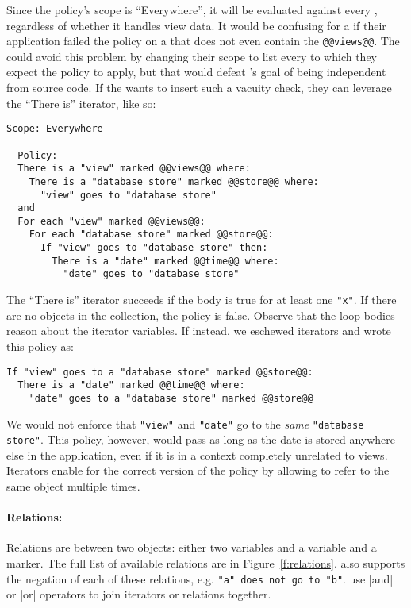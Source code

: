Since the policy's scope is ``Everywhere'', it will be evaluated against every \controller{},
regardless of whether it handles view data.
%
It would be confusing for a \dev{} if their application failed the policy on a \controller{} 
that does not even contain the \lstinline[language=CNL]|@@views@@|.
%
The \ce{} could avoid this problem by changing their scope to list every \controller{} to which they expect the policy to apply,
but that would defeat \syslang's goal of being independent from source code.
%
If the \ce{} wants to insert such a vacuity check, they can leverage the ``There is'' iterator, like so:
\begin{lstlisting}[language=CNL]
  Scope: Everywhere
  
  Policy:
  There is a "view" marked @@views@@ where:
    There is a "database store" marked @@store@@ where:
      "view" goes to "database store"
  and
  For each "view" marked @@views@@:
    For each "database store" marked @@store@@:
      If "view" goes to "database store" then:
        There is a "date" marked @@time@@ where:
          "date" goes to "database store"
\end{lstlisting}
%
The ``There is'' iterator succeeds if the body is true for at least one \lstinline[language=CNL]|"x"|.
%
If there are no objects in the collection, the policy is false.
%
Observe that the loop bodies reason about the iterator variables.
%
If instead, we eschewed iterators and wrote this policy as:
\begin{lstlisting}[language=CNL]
If "view" goes to a "database store" marked @@store@@:
  There is a "date" marked @@time@@ where:
    "date" goes to a "database store" marked @@store@@
\end{lstlisting}
We would not enforce that \lstinline[language=CNL]|"view"| and \lstinline[language=CNL]|"date"| 
go to the \emph{same} \lstinline[language=CNL]|"database store"|.
%
This policy, however, would pass as long as the date is stored anywhere else in the application,
even if it is in a context completely unrelated to views.
%
Iterators enable for the correct version of the policy by allowing \ces{} to refer to the same object multiple times.

\paragraph{Relations: }
%
Relations are between two objects: either two variables and a variable and a marker.
%
The full list of available relations are in Figure~\ref{f:relations}.
%
\syslang{} also supports the negation of each of these relations, e.g. \lstinline[language=CNL]|"a" does not go to "b"|.
%
\Ces{} use |and| or |or| operators to join iterators or relations together.

